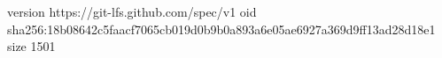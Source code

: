version https://git-lfs.github.com/spec/v1
oid sha256:18b08642c5faacf7065cb019d0b9b0a893a6e05ae6927a369d9ff13ad28d18e1
size 1501
